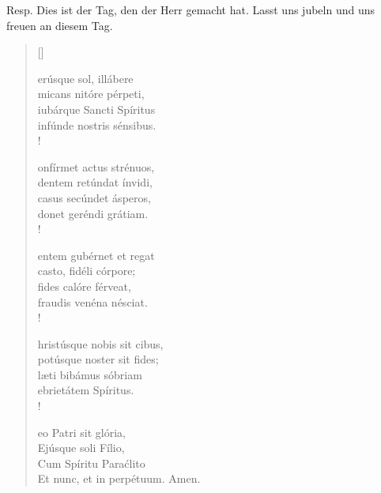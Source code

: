 

\def\greinitialformat#1{{\fontsize{40}{40}\selectfont #1}}
\resp


Resp. Dies ist der Tag, den der Herr gemacht hat. Lasst uns jubeln und uns freuen an diesem Tag.

\vspace{0.2cm}




\def\greinitialformat#1{{\fontsize{40}{40}\selectfont #1}}
\gresetfirstlineaboveinitial{\small \textcolor{red}{hieme}}{}
\setaboveinitialseparation{0.72mm}




\begin{verse}[\versewidth]

erúsque sol, illábere\\
micans nitóre pérpeti, \\
iubárque Sancti Spíritus\\
infúnde nostris sénsibus.\\!

onfírmet actus strénuos, \\
dentem retúndat ínvidi,\\
casus secúndet ásperos, \\
donet geréndi grátiam.\\!

entem gubérnet et regat\\
casto, fidéli córpore;\\
fides calóre férveat, \\
fraudis venéna nésciat.\\!

hristúsque nobis sit cibus, \\
potúsque noster sit fides;\\
læti bibámus sóbriam\\
ebrietátem Spíritus.\\!

eo Patri sit glória,\\
Ejúsque soli Fílio,\\
Cum Spíritu Paraćlito\\
Et nunc, et in perpétuum. Amen.\\

\end{verse}




